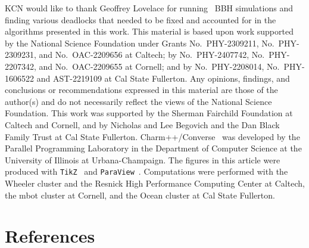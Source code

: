\begin{bibunit}[unsrtnat]
KCN would like to thank Geoffrey Lovelace for running \spectre~BBH simulations
and finding various deadlocks that needed to be fixed and accounted for in the
algorithms presented in this work. This material is based upon work supported by
the National Science Foundation under Grants No.~PHY-2309211, No.~PHY-2309231,
and No.~OAC-2209656 at Caltech; %
by No.~PHY-2407742, No.~PHY-2207342, and No.~OAC-2209655 at Cornell; and by
No.~PHY-2208014, No.~PHY-1606522 and AST-2219109 at Cal State Fullerton. Any
opinions, findings, and conclusions or recommendations expressed in this
material are those of the author(s) and do not necessarily reflect the views of
the National Science Foundation. This work was supported by the Sherman
Fairchild Foundation at Caltech and Cornell, and by Nicholas and Lee Begovich
and the Dan Black Family Trust at Cal State Fullerton.
Charm++/Converse~\cite{laxmikant_kale_2020_3972617} was developed by the
Parallel Programming Laboratory in the Department of Computer Science at the
University of Illinois at Urbana-Champaign. The figures in this article were
produced with \texttt{TikZ}~\cite{tikz} and
\texttt{ParaView}~\cite{paraview, paraview2}. Computations were performed with
the Wheeler cluster and the Resnick High Performance Computing Center at
Caltech, the mbot cluster at Cornell, and the Ocean cluster at Cal State
Fullerton.


\section*{References}
\putbib[refs]

\end{bibunit}